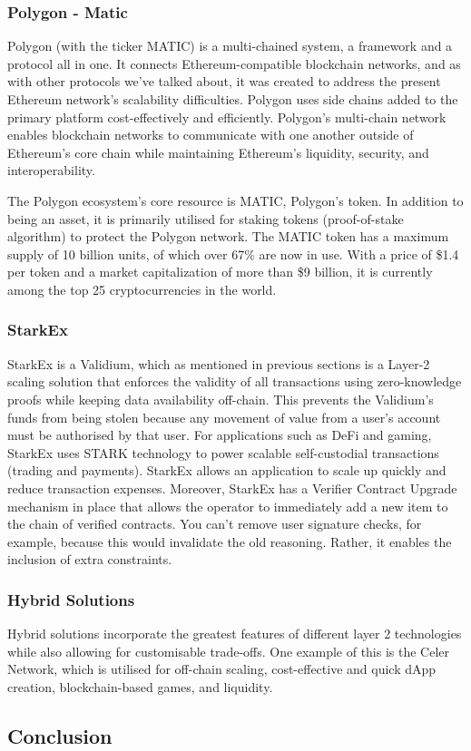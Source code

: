 \subsubsection{Polygon - Matic}
Polygon (with the ticker MATIC) is a multi-chained system, a framework and a protocol all in one. It connects Ethereum-compatible blockchain networks, and as with other protocols we've talked about, it was created to address the present Ethereum network's scalability difficulties. Polygon uses side chains added to the primary platform cost-effectively and efficiently. Polygon's multi-chain network enables blockchain networks to communicate with one another outside of Ethereum's core chain while maintaining Ethereum's liquidity, security, and interoperability.

The Polygon ecosystem's core resource is MATIC, Polygon's token. In addition to being an asset, it is primarily utilised for staking tokens (proof-of-stake algorithm) to protect the Polygon network. The MATIC token has a maximum supply of 10 billion units, of which over 67\% are now in use. With a price of \$1.4 per token and a market capitalization of more than \$9 billion, it is currently among the top 25 cryptocurrencies in the world.
\subsubsection{StarkEx}
StarkEx is a Validium, which as mentioned in previous sections is a Layer-2 scaling solution that enforces the validity of all transactions using zero-knowledge proofs while keeping data availability off-chain. This prevents the Validium's funds from being stolen because any movement of value from a user's account must be authorised by that user.
For applications such as DeFi and gaming, StarkEx uses STARK technology to power scalable self-custodial transactions (trading and payments). StarkEx allows an application to scale up quickly and reduce transaction expenses. Moreover, StarkEx has a Verifier Contract Upgrade mechanism in place that allows the operator to immediately add a new item to the chain of verified contracts. You can't remove user signature checks, for example, because this would invalidate the old reasoning. Rather, it enables the inclusion of extra constraints.
\subsubsection{Hybrid Solutions}
Hybrid solutions incorporate the greatest features of different layer 2 technologies while also allowing for customisable trade-offs. One example of this is the Celer Network, which is utilised for off-chain scaling, cost-effective and quick dApp creation, blockchain-based games, and liquidity.


\subsection{Conclusion}

